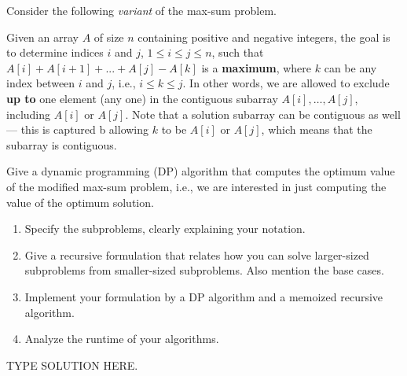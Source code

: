 \documentclass[final]{article}
\begin{document}
\begin{exercise}{6.11}
    Consider the following \emph{variant} of the max-sum problem.

    Given an array $A$ of size $n$ containing positive and negative integers, the goal is to determine indices $i$ and $j$, $1 \leq i \leq j \leq n$, such that $A[i] + A[i+1] + ... + A[j] - A[k]$ is a \textbf{maximum}, where $k$ can be any index between $i$ and $j$, i.e., $ i \leq k \leq j$. In other words, we are allowed to exclude \textbf{up to} one element (any one) in the contiguous subarray $A[i], \dots, A[j]$, including $A[i]$ or $A[j]$. Note that a solution subarray can be contiguous as well --- this is captured b allowing $k$ to be $A[i]$ or $A[j]$, which means that the subarray is contiguous.

    Give a dynamic programming (DP) algorithm that computes the optimum value of the modified max-sum problem, i.e., we are interested in just computing the value of the optimum solution.
    \begin{enumerate}
        \item Specify the subproblems, clearly explaining your notation.
        \item Give a recursive formulation that relates how you can solve larger-sized subproblems from smaller-sized subproblems. Also mention the base cases.
        \item Implement your formulation by a DP algorithm and a memoized recursive algorithm.
        \item Analyze the runtime of your algorithms.
    \end{enumerate}
\end{exercise}

\begin{solution}
    TYPE SOLUTION HERE.
\end{solution}
\end{document}

